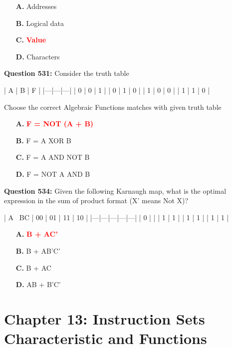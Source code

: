 \documentclass[12pt,a4paper]{article}
\begin{document}
\begin{itemize}
    \item[\textbf{A.}] Addresses
    \item[\textbf{B.}] Logical data
    \item[\textbf{C.}] \textcolor{red}{\textbf{Value}}
    \item[\textbf{D.}] Characters
\end{itemize}

\vspace{0.5cm}

\textbf{Question 531:} Consider the truth table

| A | B | F |
|---|---|---|
| 0 | 0 | 1 |
| 0 | 1 | 0 |
| 1 | 0 | 0 |
| 1 | 1 | 0 |

Choose the correct Algebraic Functions matches with given truth table

\begin{itemize}
    \item[\textbf{A.}] \textcolor{red}{\textbf{F = NOT (A + B)}}
    \item[\textbf{B.}] F = A XOR B
    \item[\textbf{C.}] F = A AND NOT B
    \item[\textbf{D.}] F = NOT A AND B
\end{itemize}

\vspace{0.5cm}

\textbf{Question 534:} Given the following Karnaugh map, what is the optimal expression in the sum of product format (X' means Not X)?

| A \ BC | 00 | 01 | 11 | 10 |
|---|---|---|---|---|
| 0 | | | 1 | 1 |
| 1 | 1 | | 1 | 1 |

\begin{itemize}
    \item[\textbf{A.}] \textcolor{red}{\textbf{B + AC'}}
    \item[\textbf{B.}] B + AB'C'
    \item[\textbf{C.}] B + AC
    \item[\textbf{D.}] AB + B'C'
\end{itemize}

\vspace{0.5cm}

\section{Chapter 13: Instruction Sets Characteristic and Functions}
\end{document}

